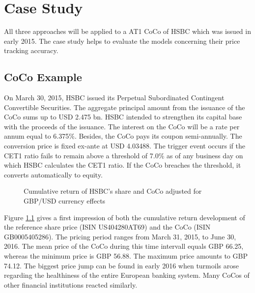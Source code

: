 \chapter{Case Study}\label{empiricalanalysis}
All three approaches will be applied to a AT1 CoCo of HSBC which was issued in early 2015. The case study helps to evaluate the models concerning their price tracking accuracy. 

\section{CoCo Example}
On March 30, 2015, HSBC issued its Perpetual Subordinated Contingent Convertible Securities. The aggregate principal amount from the issuance of the CoCo sums up to USD 2.475 bn. HSBC intended to strengthen its capital base with the proceeds of the issuance. The interest on the CoCo will be a rate per annum equal to 6.375\%. Besides, the CoCo pays its coupon semi-annually. The conversion price is fixed ex-ante at USD 4.03488. The trigger event occurs if the CET1 ratio fails to remain above a threshold of 7.0\% as of any business day on which HSBC calculates the CET1 ratio. If the CoCo breaches the threshold, it converts automatically to equity.

\begin{figure}[H]
\centering
{}
\caption[Cumulative return of HSBC's CoCo and equity]{Cumulative return of HSBC's share and CoCo adjusted for GBP/USD currency effects}
\label{fig:cumulative}
\end{figure}

Figure \ref{fig:cumulative} gives a first impression of both the cumulative return development of the reference share price (ISIN US404280AT69) and the CoCo (ISIN GB0005405286). The pricing period ranges from March 31, 2015, to June 30, 2016. The mean price of the CoCo during this time intervall equals GBP 66.25, whereas the minimum price is GBP 56.88. The maximum price amounts to GBP 74.12. The biggest price jump can be found in early 2016 when turmoils arose regarding the healthiness of the entire European banking system. Many CoCos of other financial institutions reacted similarly.

